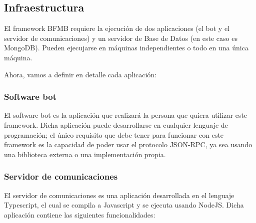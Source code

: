 \documentclass[spanish,12pt, a4paper, twoside]{paper}
\begin{document}
\subsection{Infraestructura}

El framework BFMB requiere la ejecución de dos aplicaciones (el bot y el servidor de comunicaciones) y un servidor de Base de Datos (en este caso es MongoDB). Pueden ejecujarse en máquinas independientes o todo en una única máquina.
\newline

Ahora, vamos a definir en detalle cada aplicación:

\subsubsection{Software bot}

El software bot es la aplicación que realizará la persona que quiera utilizar este framework. Dicha aplicación puede desarrollarse en cualquier lenguaje de programación; el único requisito que debe tener para funcionar con este framework es la capacidad de poder usar el protocolo JSON-RPC, ya sea usando una biblioteca externa o una implementación propia.

\subsubsection{Servidor de comunicaciones}

El servidor de comunicaciones es una aplicación desarrollada en el lenguaje Typescript, el cual se compila a Javascript y se ejecuta usando NodeJS. Dicha aplicación contiene las siguientes funcionalidades:
\end{document}
